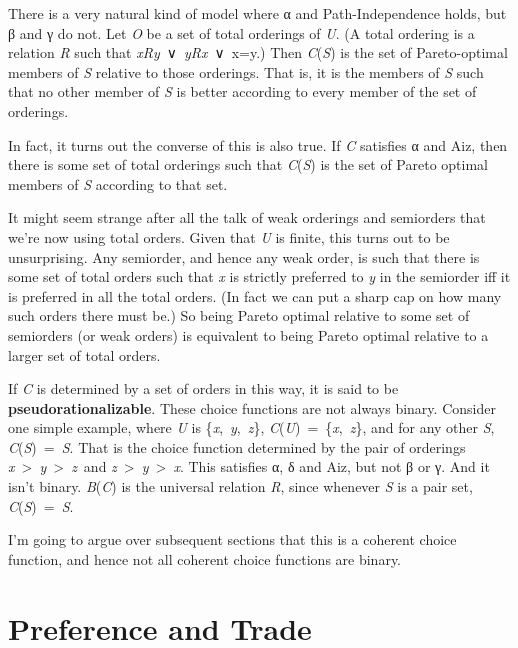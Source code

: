 \documentclass[
  11pt,
  letterpaper,
  DIV=11,
  numbers=noendperiod,
  twoside]{scrartcl}
\begin{document}
There is a very natural kind of model where α and Path-Independence
holds, but β and γ do not. Let \emph{O} be a set of total orderings of
\emph{U}. (A total ordering is a relation \emph{R} such that
\emph{xRy}~∨~\emph{yRx}~∨~x=y.) Then \emph{C}(\emph{S}) is the set of
Pareto-optimal members of \emph{S} relative to those orderings. That is,
it is the members of \emph{S} such that no other member of \emph{S} is
better according to every member of the set of orderings.

In fact, it turns out the converse of this is also true. If \emph{C}
satisfies α and Aiz, then there is some set of total orderings such that
\emph{C}(\emph{S}) is the set of Pareto optimal members of \emph{S}
according to that set.

It might seem strange after all the talk of weak orderings and
semiorders that we're now using total orders. Given that \emph{U} is
finite, this turns out to be unsurprising. Any semiorder, and hence any
weak order, is such that there is some set of total orders such that
\emph{x} is strictly preferred to \emph{y} in the semiorder iff it is
preferred in all the total orders. (In fact we can put a sharp cap on
how many such orders there must be.) So being Pareto optimal relative to
some set of semiorders (or weak orders) is equivalent to being Pareto
optimal relative to a larger set of total orders.

If \emph{C} is determined by a set of orders in this way, it is said to
be \textbf{pseudorationalizable}. These choice functions are not always
binary. Consider one simple example, where \emph{U} is
\{\emph{x},~\emph{y},~\emph{z}\},
\emph{C}(\emph{U})~=~\{\emph{x},~\emph{z}\}, and for any other \emph{S},
\emph{C}(\emph{S})~=~\emph{S}. That is the choice function determined by
the pair of orderings
\emph{x}~\textgreater~\emph{y}~\textgreater~\emph{z}~and
\emph{z}~\textgreater~\emph{y}~\textgreater~\emph{x}. This satisfies α,
δ and Aiz, but not β or γ. And it isn't binary. \emph{B}(\emph{C}) is
the universal relation \emph{R}, since whenever \emph{S} is a pair set,
\emph{C}(\emph{S})~=~\emph{S}.

I'm going to argue over subsequent sections that this is a coherent
choice function, and hence not all coherent choice functions are binary.

\section{Preference and Trade}\label{sec-trade}
\end{document}
